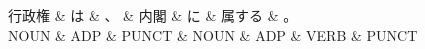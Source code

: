 \documentclass[tikz,border=5pt]{standalone}
\begin{document}
\normalsize
\begin{dependency}[edge unit distance=12.0pt]
    \begin{deptext}[column sep=1em]
        行政権 \& は \& 、 \& 内閣 \& に \& 属する \& 。\\
        NOUN \& ADP \& PUNCT \& NOUN \& ADP \& VERB \& PUNCT\\
    \end{deptext}
\end{dependency}
\end{document}
